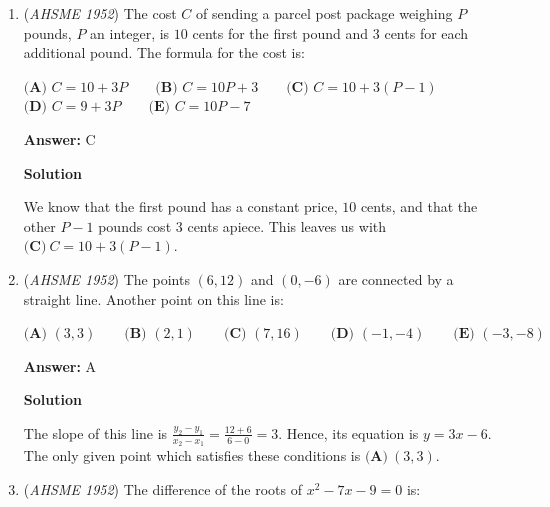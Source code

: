 \begin{enumerate}
 $\textbf{(A) \ }\left(a-\frac{1}{a}\right)\left(a^2+1+\frac{1}{a^2}\right) \qquad \textbf{(B) \ }\left(\frac{1}{a}-a\right)\left(a^2-1+\frac{1}{a^2}\right) \qquad \textbf{(C) \ }\left(a-\frac{1}{a}\right)\left(a^2-2+\frac{1}{a^2}\right) \qquad$
$\textbf{(D) \ }\left(\frac{1}{a}-a\right)\left(\frac{1}{a^2}+1+a^2\right) \qquad \textbf{(E) \ }\text{none of these}$

 \textbf{Answer: }A



\textbf{Solution}

Recall that $x^3-y^3=(x-y)(x^2+xy+y^2)$. Letting $a=x$ and $a^{-1}=y$, we find that $a^3-a^{-3}= \boxed{\textbf{(A)}\ \left(a-\frac{1}{a}\right)\left(a^2+1+\frac{1}{a^2}\right)}$.

 


	\item (\textit{AHSME 1952}) The cost $C$ of sending a parcel post package weighing $P$ pounds, $P$ an integer, is $10$ cents for the first pound and $3$ cents for each additional pound. The formula for the cost is:


 $\textbf{(A) \ }C=10+3P \qquad \textbf{(B) \ }C=10P+3 \qquad \textbf{(C) \ }C=10+3(P-1) \qquad$
$\textbf{(D) \ }C=9+3P \qquad \textbf{(E) \ }C=10P-7$

 \textbf{Answer: }C



\textbf{Solution}

We know that the first pound has a constant price, $10$ cents, and that the other $P-1$ pounds cost $3$ cents apiece. This leaves us with $\boxed{\textbf{(C)}\ C=10+3(P-1)}$.

 


	\item (\textit{AHSME 1952}) The points $(6,12)$ and $(0,-6)$ are connected by a straight line. Another point on this line is:


 $\textbf{(A) \ }(3,3)  \qquad \textbf{(B) \ }(2,1) \qquad \textbf{(C) \ }(7,16) \qquad \textbf{(D) \ }(-1,-4) \qquad \textbf{(E) \ }(-3,-8)$

 \textbf{Answer: }A



\textbf{Solution}

The slope of this line is $\frac{y_2-y_1}{x_2-x_1}=\frac{12+6}{6-0}=3$. Hence, its equation is $y=3x-6$. The only given point which satisfies these conditions is $\boxed{\textbf{(A)}\ (3,3)}$.

 


	\item (\textit{AHSME 1952}) The difference of the roots of $x^2-7x-9=0$ is:



\end{enumerate}
